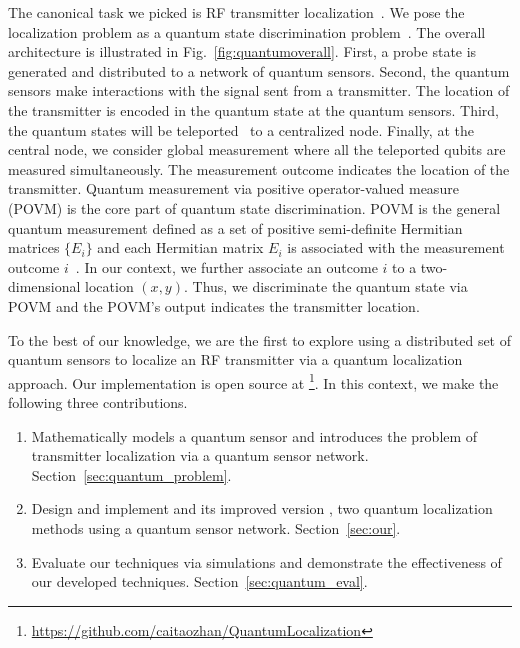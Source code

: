 The canonical task we picked is RF transmitter localization~\cite{nsdi13-arraytrack,pmc22-deepmtlpro}.
We pose the localization problem as a quantum state discrimination problem~\cite{bergou-review-2007}. 
The overall architecture is illustrated in Fig.~\ref{fig:quantumoverall}.
First, a probe state is generated and distributed to a network of quantum sensors.
Second, the quantum sensors make interactions with the signal sent from a transmitter. 
The location of the transmitter is encoded in the quantum state at the quantum sensors.
Third, the quantum states will be teleported~\cite{ton22-quantum} to a centralized node.
Finally, at the central node, we consider global measurement where all the teleported qubits are measured simultaneously. 
The measurement outcome indicates the location of the transmitter.
Quantum measurement via positive operator-valued measure (POVM) is the core part of quantum state discrimination.
POVM is the general quantum measurement defined as a set of positive semi-definite Hermitian matrices $\{E_i\}$ and each Hermitian matrix $E_i$ is associated with the measurement outcome $i$~\cite{qcqi-book}.
In our context, we further associate an outcome $i$ to a two-dimensional location $(x, y)$.
Thus, we discriminate the quantum state via POVM and the POVM's output indicates the transmitter location.


To the best of our knowledge, we are the first to explore using a distributed set of quantum sensors to localize an RF transmitter via a quantum localization approach. 
Our implementation is open source at \footnote{\url{https://github.com/caitaozhan/QuantumLocalization}}.
In this context, we make the following three contributions.
\begin{enumerate}
    \item Mathematically models a quantum sensor and introduces the problem of transmitter localization via a quantum sensor network. Section~\ref{sec:quantum_problem}.
    \item Design and implement \povm and its improved version \povmpro, two quantum localization methods using a quantum sensor network. Section~\ref{sec:our}.
    \item Evaluate our techniques via simulations and demonstrate the effectiveness of our developed techniques. Section~\ref{sec:quantum_eval}.
\end{enumerate}

